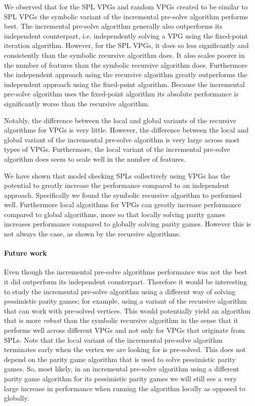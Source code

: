 We observed that for the SPL VPGs and random VPGs created to be similar to SPL VPGs the symbolic variant of the incremental pre-solve algorithm performs best. The incremental pre-solve algorithm generally also outperforms its independent counterpart, i.e. independently solving a VPG using the fixed-point iteration algorithm. However, for the SPL VPGs, it does so less significantly and consistently than the symbolic recursive algorithm does. It also scales poorer in the number of features than the symbolic recursive algorithm does. Furthermore the independent approach using the recursive algorithm greatly outperforms the independent approach using the fixed-point algorithm. Because the incremental pre-solve algorithm uses the fixed-point algorithm its absolute performance is significantly worse than the recursive algorithm.

Notably, the difference between the local and global variants of the recursive algorithms for VPGs is very little. However, the difference between the local and global variant of the incremental pre-solve algorithm is very large across most types of VPGs. Furthermore, the local variant of the incremental pre-solve algorithm does seem to scale well in the number of features.

We have shown that model checking SPLs collectively using VPGs has the potential to greatly increase the performance compared to an independent approach. Specifically we found the symbolic recursive algorithm to performed well. Furthermore local algorithms for VPGs can greatly increase performance compared to global algorithms, more so that locally solving parity games increases performance compared to globally solving parity games. However this is not always the case, as shown by the recursive algorithms.

\paragraph{Future work} Even though the incremental pre-solve algorithms performance was not the best it did outperform its independent counterpart. Therefore it would be interesting to study the incremental pre-solve algorithm using a different way of solving pessimistic parity games; for example, using a variant of the recursive algorithm that can work with pre-solved vertices. This would potentially yield an algorithm that is more \textit{robust}  than the symbolic recursive algorithm in the sense that it performs well across different VPGs and not only for VPGs that originate from SPLs. Note that the local variant of the incremental pre-solve algorithm terminates early when the vertex we are looking for is pre-solved. This does not depend on the parity game algorithm that is used to solve pessimistic parity games. So, most likely, in an incremental pre-solve algorithm using a different parity game algorithm for its pessimistic parity games we will still see a very large increase in performance when running the algorithm locally as opposed to globally.

